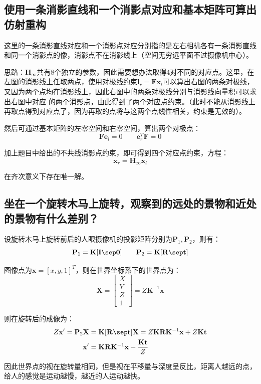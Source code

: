\documentclass[11pt]{article}
\begin{document}
\subsection{使用一条消影直线和一个消影点对应和基本矩阵可算出仿射重构}
这里的一条消影直线对应和一个消影点对应分别指的是左右相机各有一条消影直线和同一个消影点的像，消影点不在消影线上（空间无穷远平面不过摄像机中心）。\par
思路：$\mathbf{H}_\infty$共有8个独立的参数，因此需要想办法取得4对不同的对应点。这里，在左图的消影线上任取两点，使用对极线约束$\mathbf{l}_r=\mathbf{Fx}_l$可以算出右图的两条对极线，又因为两个点均在消影线上，因此右图中的两条对极线分别与消影线向量积可以求出右图中对应 的两个消影点，由此得到了两个对应点约束。（此时不能从消影线上再取点得到对应点了，因为再取的点将与这两个点线性相关，约束是无效的）。\par
然后可通过基本矩阵的左零空间和右零空间，算出两个对极点：
\begin{equation*}
  \mathbf{Fe}_l=0\qquad\mathbf{e}_r^T\mathbf{F}=0
\end{equation*}\par
加上题目中给出的不共线消影点约束，即可得到四个对应点约束，方程：
\begin{equation*}
  \mathbf{x}_r=\mathbf{H}_\infty \mathbf{x}_l
\end{equation*}\par
在齐次意义下存在唯一解。
\subsection{坐在一个旋转木马上旋转，观察到的远处的景物和近处的景物有什么差别？}
\par
设旋转木马上旋转前后的人眼摄像机的投影矩阵分别为$\mathbf{P}_1,\mathbf{P}_2$，则有：
\begin{equation*}
  \mathbf{P}_1=\mathbf{K[I\sep 0]}\qquad\mathbf{P}_2=\mathbf{K[R\sep t ]}
\end{equation*}\par
图像点为$\mathbf{x}=[x,y,1]^T$，则在世界坐标系下的世界点为：
\begin{equation*}
  \mathbf{X}=\begin{bmatrix}
    X \\Y\\Z\\1
  \end{bmatrix}=Z\mathbf{K^\mathrm{-1}x}
\end{equation*}\par
则在旋转后的成像为：
\begin{align*}
  Z\mathbf{x}'=\mathbf{P}_2\mathbf{X}&=\mathbf{K[R\sep t ]}\mathbf{X}  =Z\mathbf{KRK^\mathrm{-1}x}+Z\mathbf{Kt} \\
  \mathbf{x}'&=\mathbf{KRK^\mathrm{-1}x}+\frac{\mathbf{Kt}}{Z}
\end{align*}\par
因此世界点的视在旋转量相同，但是视在平移量与深度呈反比，距离人越远的点，给人的感觉是运动越慢，越近的人运动越快。
\end{document}
